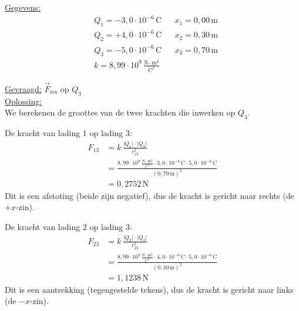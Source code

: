 \documentclass{ximera}
\begin{document}
\begin{exercise}
\begin{question}
        \begin{solution}\nl
            \underline{Gegevens:}
            \begin{align*}
                & Q_{1} = -3{,}0 \cdot 10^{-6} \, \mathrm{C} & & x_{1} = 0{,}00 \, \mathrm{m}\\
                & Q_{2} = +4{,}0 \cdot 10^{-6} \, \mathrm{C} & & x_{2} = 0{,}30 \, \mathrm{m}\\
                & Q_{3} = -5{,}0 \cdot 10^{-6} \, \mathrm{C} & & x_{3} = 0{,}70 \, \mathrm{m}\\
                & k = 8{,}99 \cdot 10^9 \, \mathrm{\frac{N \cdot m^2}{C^2}} & & 
            \end{align*}
    
            \underline{Gevraagd:} $\vec{F}_{\text{res}}$ op \(Q_{3}\) \\
    
            \underline{Oplossing:}\\
            We berekenen de groottes van de twee krachten die inwerken op $Q_3$.
            
            De kracht van lading 1 op lading 3:
            \begin{align*}
                F_{13}&=k\,\frac{\lvert Q_{1}\rvert\cdot \lvert Q_{3}\rvert}{r_{13}^{2}}\\
                &=\frac{8{,}99 \cdot 10^9 \, \mathrm{\frac{N \cdot m^2}{C^2}} \cdot 3{,}0 \cdot 10^{-6} \, \mathrm{C} \cdot 5{,}0 \cdot 10^{-6} \, \mathrm{C}}{(0{,}70 \, \mathrm{m})^{2}}\\
                &= 0{,}2752 \, \mathrm{N}
            \end{align*}
            Dit is een afstoting (beide zijn negatief), dus de kracht is gericht naar rechts (de $+x$-zin).
            
            De kracht van lading 2 op lading 3:
            \begin{align*}
                F_{23}&=k\,\frac{\lvert Q_{2}\rvert\cdot \lvert Q_{3}\rvert}{r_{23}^{2}}\\
                &=\frac{8{,}99 \cdot 10^9 \, \mathrm{\frac{N \cdot m^2}{C^2}} \cdot 4{,}0 \cdot 10^{-6} \, \mathrm{C} \cdot 5{,}0 \cdot 10^{-6} \, \mathrm{C}}{(0{,}40 \, \mathrm{m})^{2}}\\
                &= 1{,}1238 \, \mathrm{N}
            \end{align*}
            Dit is een aantrekking (tegengestelde tekens), dus de kracht is gericht naar links (de $-x$-zin).


\end{solution}
\end{question}
\end{exercise}
\end{document}
